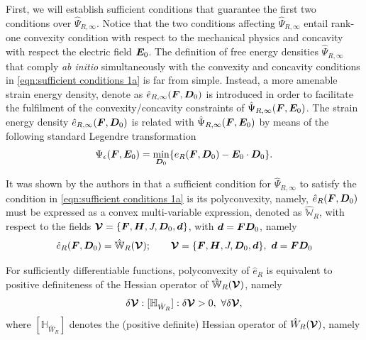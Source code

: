  
 
\vspace{15mm} 
 
 
First, we will establish sufficient conditions that guarantee the first two conditions over $\hat{\Psi}_{R,\infty}$. Notice that the two conditions affecting $\hat{\Psi}_{R,\infty}$ entail rank-one convexity condition with respect to the mechanical physics and concavity with respect the electric field $\boldsymbol{E}_0$. The definition of free energy densities $\hat{\Psi}_{R,\infty}$ that comply \textit{ab initio} simultaneously with the convexity and concavity conditions in \eqref{eqn:sufficient conditions 1a} is far from simple. Instead, a more amenable strain energy density, denote as $\hat{e}_{R,\infty}(\boldsymbol{F},\boldsymbol{D}_0)$ is introduced in order to facilitate the fulfilment of the convexity/concavity constraints of $\hat{\Psi}_{R,\infty}(\boldsymbol{F},\boldsymbol{E}_0)$. The strain energy density $\hat{e}_{R,\infty}(\boldsymbol{F},\boldsymbol{D}_0)$ is related with $\hat{\Psi}_{R,\infty}(\boldsymbol{F},\boldsymbol{E}_0)$ by means of the following standard Legendre transformation
%
\begin{equation}\label{eqn:Internal 1}
	\Psi_{\epsilon}(\boldsymbol{F},\boldsymbol{E}_0) = \min_{\boldsymbol{D}_0}\{e_{R}(\boldsymbol{F},\boldsymbol{D}_0) - \boldsymbol{E}_0\cdot\boldsymbol{D}_0\}.
\end{equation}

It was shown by the authors in  that a sufficient condition for  $\hat{\Psi}_{R,\infty}$ to satisfy the condition in \eqref{eqn:sufficient conditions 1a} is its polyconvexity, namely, $\hat{e}_{R}(\boldsymbol{F},\boldsymbol{D}_0)$ must be expressed as a convex multi-variable expression, denoted as $\hat{\mathbb{W}}_R$, with respect to the fields $\boldsymbol{\mathcal{V}}=\{\boldsymbol{F},\boldsymbol{H},J,\boldsymbol{D}_0,\boldsymbol{d}\}$, with $\boldsymbol{d}=\boldsymbol{FD}_0$, namely 
%
\begin{equation}\label{eqn:polyconvexity}
	\hat{e}_R(\boldsymbol{F},\boldsymbol{D}_0)=\hat{\mathbb{W}}_R(\boldsymbol{\mathcal{V}});\qquad \boldsymbol{\mathcal{V}}=\{\boldsymbol{F},\boldsymbol{H},J,\boldsymbol{D}_0,\boldsymbol{d}\}, \,\,\boldsymbol{d}=\boldsymbol{FD}_0
\end{equation}

For sufficiently differentiable functions, polyconvexity of $\hat{e}_R$ is equivalent to positive definiteness of the Hessian operator of $\hat{\mathbb{W}}_R(\boldsymbol{\mathcal{V}})$, namely
%
%
\begin{equation}\label{eqn:polyconvexity iso}
	\delta{\boldsymbol{\mathcal{V}}}:[\mathbb{H}_{\hat{W}_{R}}]:\delta{\boldsymbol{\mathcal{V}}}>0,\,\,\forall \delta{\boldsymbol{\mathcal{V}}},
\end{equation}
%
where $[\mathbb{H}_{\hat{W}_{R}}]$ denotes the (positive definite) Hessian operator of $\hat{W}_{R}(\boldsymbol{\mathcal{V}})$, namely
%

